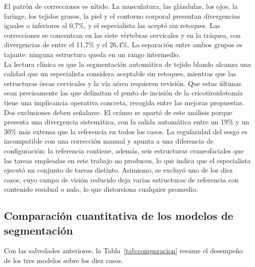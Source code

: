 El patrón de correcciones es nítido. La musculatura, las glándulas, los ojos, la faringe, los tejidos grasos, la piel y el contorno corporal presentan divergencias iguales o inferiores al 0,7\%, y el especialista las aceptó sin retoques. Las correcciones se concentran en las siete vértebras cervicales y en la tráquea, con divergencias de entre el 11,7\% y el 26,4\%. La separación entre ambos grupos es tajante: ninguna estructura queda en un rango intermedio.\\

La lectura clínica es que la segmentación automática de tejido blando alcanza una calidad que un especialista considera aceptable sin retoques, mientras que las estructuras óseas cervicales y la vía aérea requieren revisión. Que estas últimas sean precisamente las que delimitan el punto de incisión de la cricotiroidotomía tiene una implicancia operativa concreta, recogida entre las mejoras propuestas.\\

Dos exclusiones deben señalarse. El cráneo se apartó de este análisis porque presenta una divergencia sistemática, con la salida automática entre un 19\% y un 30\% más extensa que la referencia en todos los casos. La regularidad del sesgo es incompatible con una corrección manual y apunta a una diferencia de configuración: la referencia contiene, además, seis estructuras craneofaciales que las tareas empleadas en este trabajo no producen, lo que indica que el especialista ejecutó un conjunto de tareas distinto. Asimismo, se excluyó uno de los diez casos, cuyo campo de visión reducido deja varias estructuras de referencia con contenido residual o nulo, lo que distorsiona cualquier promedio.\\

\subsection{Comparación cuantitativa de los modelos de segmentación}

Con las salvedades anteriores, la Tabla~\ref{tab:comparacion} resume el desempeño de los tres modelos sobre los diez casos.\\

